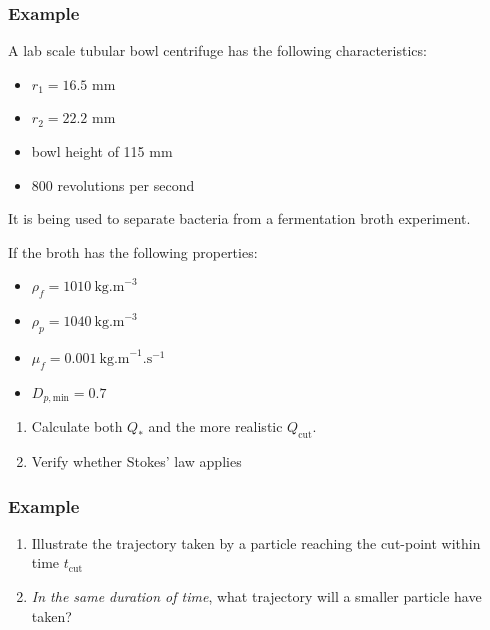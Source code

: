 \begin{frame}\frametitle{Example}
	A lab scale tubular bowl centrifuge has the following characteristics:
	\begin{itemize}
		\item	$r_1 = 16.5$ mm
		\item	$r_2 = 22.2$ mm
		\item	bowl height of 115 mm
		\item	800 revolutions per second
	\end{itemize}

	It is being used to separate bacteria from a fermentation broth experiment.
	
	
	\vspace{12pt}
	If the broth has the following properties:
	\begin{itemize}
		\item	$\rho_f = 1010~\text{kg.m}^{-3}$   \hfill {\color{myOrange}{$\leftarrow$ note how close these are}}
		\item	$\rho_p = 1040~\text{kg.m}^{-3}$
		\item	$\mu_f = 0.001~\text{kg.m}^{-1}\text{.s}^{-1}$
		\item	$D_{p,\text{min}} = 0.7$ \micron   \hfill {\color{myOrange}{$\leftarrow$ note how small}}
	\end{itemize}
	\begin{enumerate}
		\item	Calculate both $Q_*$ and the more realistic $Q_\text{cut}$.
		\item	Verify whether Stokes' law applies
	\end{enumerate}
		
\end{frame}

\begin{frame}\frametitle{Example}
	\begin{enumerate}
		\item	Illustrate the trajectory taken by a particle reaching the cut-point within time $t_\text{cut}$
		\item	\emph{In the same duration of time}, what trajectory will a smaller particle have taken?
	\end{enumerate}
	\vspace{10cm}
\end{frame}

